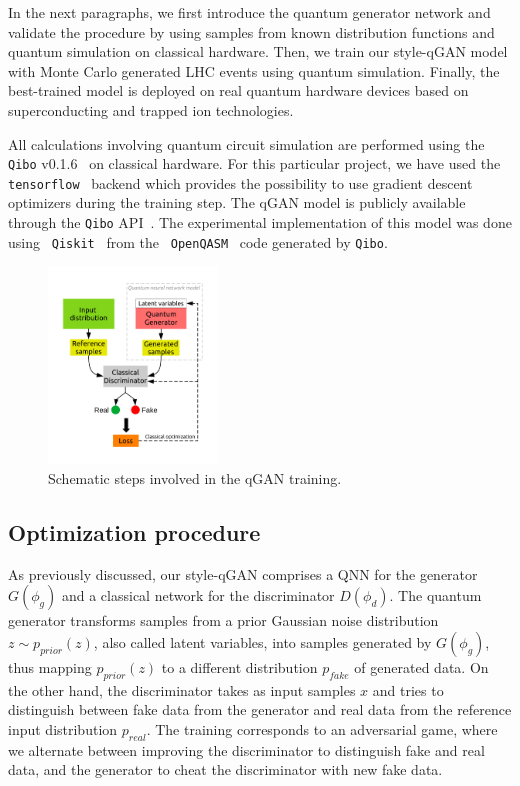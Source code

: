 \documentclass[twocolumn,preprintnumbers,superscriptaddress]{revtex4-2}
\begin{document}
In the next paragraphs, we first introduce the quantum
generator network and validate the procedure by using samples from known
distribution functions and quantum simulation on classical hardware. Then, we
train our style-qGAN model with Monte Carlo generated LHC events using quantum
simulation. Finally, the best-trained model is deployed on real quantum hardware
devices based on superconducting and trapped ion technologies.

All calculations involving quantum circuit simulation are performed using the
{\tt Qibo} v0.1.6~\cite{efthymiou2020qibo,stavros_efthymiou_2021_5088103} on
classical hardware. For this particular project, we have used the {\tt
tensorflow}~\cite{tensorflow2015-whitepaper} backend which provides the
possibility to use gradient descent optimizers during the training step. The
qGAN model is publicly available through the {\tt Qibo} API~\cite{add_cite_tutorial}. The experimental
implementation of this model was done using {\tt
Qiskit}~\cite{gadi_aleksandrowicz_2019_2562111} from the {\tt
OpenQASM}~\cite{cross2017open} code generated by {\tt Qibo}.

\begin{figure}
  \includegraphics[width=0.4\textwidth]{plots/scheme.pdf}
  \caption{\label{fig:scheme} Schematic steps involved in the qGAN training.}
\end{figure}

\subsection{Optimization procedure}

As previously discussed, our style-qGAN comprises a QNN for the generator $G(\phi_g)$ and a classical network for the discriminator $D(\phi_d)$. The quantum generator transforms samples from a prior Gaussian noise distribution $z \sim p_{prior}(z)$, also called latent variables, into samples generated by $G(\phi_g)$, thus mapping $p_{prior}(z)$ to a different distribution $p_{fake}$ of generated data. On the other hand, the discriminator takes as input samples $x$ and tries to distinguish between fake data from the generator and real data from the reference input distribution $p_{real}$. The training corresponds to an adversarial game, where we alternate between improving the discriminator to distinguish fake and real data, and the generator to cheat the discriminator with new fake data.
\end{document}
